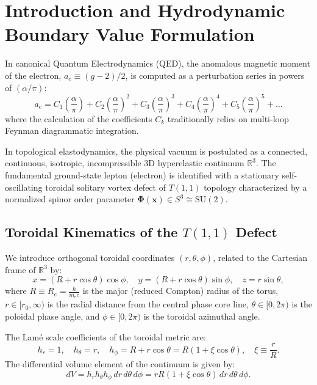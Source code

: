 \documentclass[12pt,a4paper]{article}
\begin{document}
	\newpage
	
	\section{Introduction and Hydrodynamic Boundary Value Formulation}
	
	In canonical Quantum Electrodynamics (QED), the anomalous magnetic moment of the electron, $a_e \equiv (g-2)/2$, is computed as a perturbation series in powers of $(\alpha/\pi)$:
	\begin{equation}
		a_e = C_1 \left(\frac{\alpha}{\pi}\right) + C_2 \left(\frac{\alpha}{\pi}\right)^2 + C_3 \left(\frac{\alpha}{\pi}\right)^3 + C_4 \left(\frac{\alpha}{\pi}\right)^4 + C_5 \left(\frac{\alpha}{\pi}\right)^5 + \dots
	\end{equation}
	where the calculation of the coefficients $C_k$ traditionally relies on multi-loop Feynman diagrammatic integration.
	
	In topological elastodynamics, the physical vacuum is postulated as a connected, continuous, isotropic, incompressible 3D hyperelastic continuum $\mathbb{R}^3$. The fundamental ground-state lepton (electron) is identified with a stationary self-oscillating toroidal solitary vortex defect of $T(1,1)$ topology characterized by a normalized spinor order parameter $\boldsymbol{\Phi}(\mathbf{x}) \in S^3 \cong \mathrm{SU}(2)$.
	
	\subsection{Toroidal Kinematics of the $T(1,1)$ Defect}
	We introduce orthogonal toroidal coordinates $(r, \theta, \phi)$, related to the Cartesian frame of $\mathbb{R}^3$ by:
	\begin{equation}
		x = (R + r \cos\theta) \cos\phi, \quad y = (R + r \cos\theta) \sin\phi, \quad z = r \sin\theta,
	\end{equation}
	where $R \equiv R_e = \frac{\hbar}{m_e c}$ is the major (reduced Compton) radius of the torus, $r \in [r_0, \infty)$ is the radial distance from the central phase core line, $\theta \in [0, 2\pi)$ is the poloidal phase angle, and $\phi \in [0, 2\pi)$ is the toroidal azimuthal angle.
	
	The Lamé scale coefficients of the toroidal metric are:
	\begin{equation}
		h_r = 1, \quad h_\theta = r, \quad h_\phi = R + r \cos\theta = R(1 + \xi \cos\theta), \quad \xi \equiv \frac{r}{R}.
	\end{equation}
	The differential volume element of the continuum is given by:
	\begin{equation}
		dV = h_r h_\theta h_\phi \, dr \, d\theta \, d\phi = r R (1 + \xi \cos\theta) \, dr \, d\theta \, d\phi.
	\end{equation}
	
\end{document}
